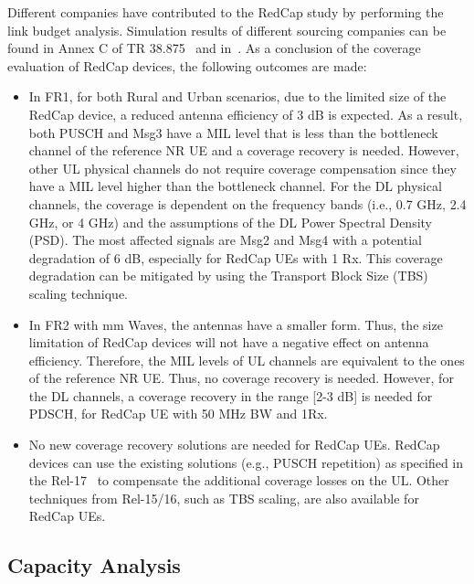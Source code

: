 \documentclass[]{IEEEtran}
\begin{document}
Different companies have contributed to the RedCap study by performing the link budget analysis. Simulation results of different sourcing companies can be found in Annex C of TR 38.875~\cite{3gpp_study_2021_38.875} and in~\cite{3gpp_fl_2022_R1-2009293}. As a conclusion of the coverage evaluation of RedCap devices, the following outcomes are made:
\begin{itemize}
    \item In FR1, for both Rural and Urban scenarios, due to the limited size of the RedCap device, a reduced antenna efficiency of 3 dB is expected. 
    As a result, both PUSCH and Msg3 have a MIL level that is less than the bottleneck channel of the reference NR UE and a coverage recovery is needed. 
    However, other UL physical channels do not require coverage compensation since they have a MIL level higher than the bottleneck channel. 
    For the DL physical channels, the coverage is dependent on the frequency bands (i.e., 0.7 GHz, 2.4 GHz, or 4 GHz) and the assumptions of the DL Power Spectral Density (PSD). The most affected signals are Msg2 and Msg4 with a potential degradation of 6 dB, especially for RedCap UEs with 1 Rx. This coverage degradation can be mitigated by using the  Transport Block Size (TBS) scaling technique.
    \item In FR2 with mm Waves, the antennas have a smaller form. Thus, the size limitation of RedCap devices will not have a negative effect on antenna efficiency.
    Therefore, the MIL levels of UL channels are equivalent to the ones of the reference NR UE. Thus, no coverage recovery is needed. 
    However, for the DL channels, a coverage recovery in the range [2-3 dB] is needed for PDSCH, for RedCap UE with 50 MHz BW and 1Rx.
    \item No new coverage recovery solutions are needed for RedCap UEs.
    RedCap devices can use the existing solutions (e.g., PUSCH repetition) as specified in the Rel-17~\cite{3gpp_study_nodate-3_38.830} to compensate the additional coverage losses on the UL.
    Other techniques from Rel-15/16, such as TBS scaling, are also available for RedCap UEs.
\end{itemize}


\subsection{Capacity Analysis}
\label{sec:6-2}
\end{document}
